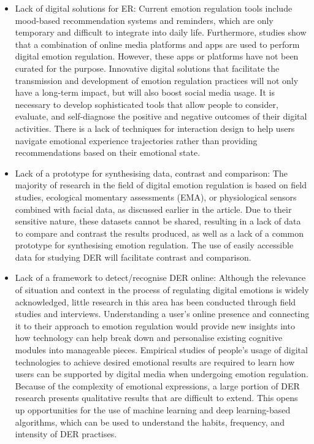\begin{itemize}
    \item Lack of digital solutions for ER: Current emotion regulation tools include mood-based recommendation systems and reminders, which are only temporary and difficult to integrate into daily life. Furthermore, studies show that a combination of online media platforms and apps are used to perform digital emotion regulation. However, these apps or platforms have not been curated for the purpose. Innovative digital solutions that facilitate the transmission and development of emotion regulation practices will not only have a long-term impact, but will also boost social media usage. It is necessary to develop sophisticated tools that allow people to consider, evaluate, and self-diagnose the positive and negative outcomes of their digital activities. There is a lack of techniques for interaction design to help users navigate emotional experience trajectories rather than providing recommendations based on their emotional state.
    \item Lack of a prototype for synthesising data, contrast and comparison: The majority of research in the field of digital emotion regulation is based on field studies, ecological momentary assessments (EMA), or physiological sensors combined with facial data, as discussed earlier in the article. Due to their sensitive nature, these datasets cannot be shared, resulting in a lack of data to compare and contrast the results produced, as well as a lack of a common prototype for synthesising emotion regulation. The use of easily accessible data for studying DER will facilitate contrast and comparison.
    \item Lack of a framework to detect/recognise DER online: Although the relevance of situation and context in the process of regulating digital emotions is widely acknowledged, little research in this area has been conducted through field studies and interviews. Understanding a user's online presence and connecting it to their approach to emotion regulation would provide new insights into how technology can help break down and personalise existing cognitive modules into manageable pieces. Empirical studies of people's usage of digital technologies to achieve desired emotional results are required to learn how users can be supported by digital media when undergoing emotion regulation. Because of the complexity of emotional expressions, a large portion of DER research presents qualitative results that are difficult to extend. This opens up opportunities for the use of machine learning and deep learning-based algorithms, which can be used to understand the habits, frequency, and intensity of DER practises.
\end{itemize}


